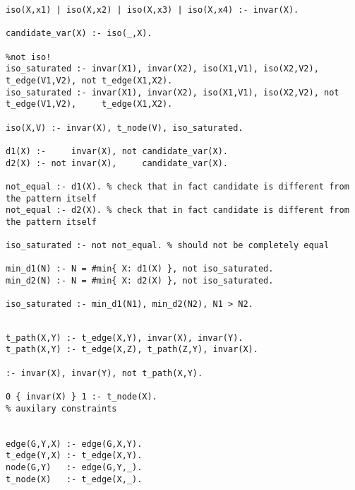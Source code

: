 \documentclass{article}
\theoremstyle{definition}
\begin{document}
\begin{lstlisting}[caption=Canonicity template-based check, style=model]
iso(X,x1) | iso(X,x2) | iso(X,x3) | iso(X,x4) :- invar(X).

candidate_var(X) :- iso(_,X).

%not iso!
iso_saturated :- invar(X1), invar(X2), iso(X1,V1), iso(X2,V2),     t_edge(V1,V2), not t_edge(X1,X2). 
iso_saturated :- invar(X1), invar(X2), iso(X1,V1), iso(X2,V2), not t_edge(V1,V2),     t_edge(X1,X2).

iso(X,V) :- invar(X), t_node(V), iso_saturated.

d1(X) :-     invar(X), not candidate_var(X). 
d2(X) :- not invar(X),     candidate_var(X).

not_equal :- d1(X). % check that in fact candidate is different from the pattern itself
not_equal :- d2(X). % check that in fact candidate is different from the pattern itself

iso_saturated :- not not_equal. % should not be completely equal

min_d1(N) :- N = #min{ X: d1(X) }, not iso_saturated.
min_d2(N) :- N = #min{ X: d2(X) }, not iso_saturated.

iso_saturated :- min_d1(N1), min_d2(N2), N1 > N2.
\end{lstlisting}

\begin{lstlisting}[caption=Auxilary predicates -- probably should be moved to appendix, style=model]
%selects subpattern

t_path(X,Y) :- t_edge(X,Y), invar(X), invar(Y).
t_path(X,Y) :- t_edge(X,Z), t_path(Z,Y), invar(X).

:- invar(X), invar(Y), not t_path(X,Y).

0 { invar(X) } 1 :- t_node(X).
% auxilary constraints


edge(G,Y,X) :- edge(G,X,Y).
t_edge(Y,X) :- t_edge(X,Y).
node(G,Y)   :- edge(G,Y,_).
t_node(X)   :- t_edge(X,_).
\end{lstlisting}
\end{document}
